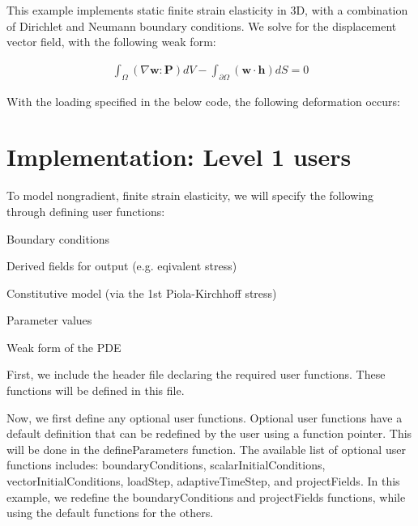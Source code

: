 

This example implements static finite strain elasticity in 3\-D, with a combination of Dirichlet and Neumann boundary conditions. We solve for the displacement vector field, with the following weak form\-:

\begin{eqnarray*} \int_\Omega (\nabla{\boldsymbol{w}}:\boldsymbol{P}) dV - \int_{\partial\Omega} (\boldsymbol{w}\cdot\boldsymbol{h}) dS = 0 \end{eqnarray*}

With the loading specified in the below code, the following deformation occurs\-:

 

\section*{Implementation\-: Level 1 users }

To model nongradient, finite strain elasticity, we will specify the following through defining user functions\-: \par

\begin{DoxyItemize}
\item Boundary conditions \par

\item Derived fields for output (e.\-g. eqivalent stress) \par

\item Constitutive model (via the 1st Piola-\/\-Kirchhoff stress) \par

\item Parameter values \par

\item Weak form of the P\-D\-E \par

\end{DoxyItemize}

First, we include the header file declaring the required user functions. These functions will be defined in this file.


\begin{DoxyCodeInclude}

\end{DoxyCodeInclude}


Now, we first define any optional user functions. Optional user functions have a default definition that can be redefined by the user using a function pointer. This will be done in the {\ttfamily define\-Parameters} function. The available list of optional user functions includes\-: {\ttfamily boundary\-Conditions}, {\ttfamily scalar\-Initial\-Conditions}, {\ttfamily vector\-Initial\-Conditions}, {\ttfamily load\-Step}, {\ttfamily adaptive\-Time\-Step}, and {\ttfamily project\-Fields}. In this example, we redefine the {\ttfamily boundary\-Conditions} and {\ttfamily project\-Fields} functions, while using the default functions for the others.


